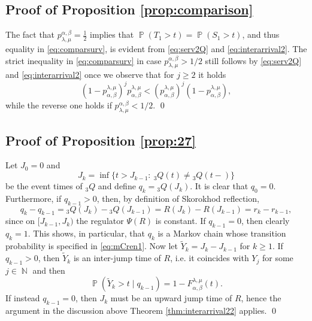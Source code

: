 \documentclass[]{amsart}
\numberwithin{equation}{section}
\theoremstyle{remark}
\theoremstyle{definition}
\DeclareMathOperator{\N}{\mathbb{N}}
\DeclareMathOperator{\bP}{\mathbb{P}}
\begin{document}
\subsection{Proof of Proposition \ref{prop:comparison}}\label{proofcomp}
	The fact that $p_{\lambda,\mu}^{\alpha,\beta}=\frac{1}{2}$ implies that $\bP({T}_1>t)=\bP({S}_1>t)$, and thus equality in \eqref{eq:comparsurv}, is evident from \eqref{eq:serv2Q} and \eqref{eq:interarrival2}. The strict inequality  in \eqref{eq:comparsurv} in case $p_{\lambda,\mu}^{\alpha,\beta}>1/2$ still follows by \eqref{eq:serv2Q} and \eqref{eq:interarrival2} once we observe that for $j \ge 2$ it holds
	\begin{equation*}
		(1-p_{\alpha,\beta}^{\lambda,\mu})^jp_{\alpha,\beta}^{\lambda,\mu}<(p_{\alpha,\beta}^{\lambda,\mu})^j(1-p_{\alpha,\beta}^{\lambda,\mu}),
	\end{equation*}
	while the reverse one holds if $p_{\lambda,\mu}^{\alpha,\beta}<1/2$.
\hfill \qed 
\subsection{Proof of Proposition \ref{prop:27}}\label{proofprop27}
	Let $J_0=0$ and
	\begin{equation*}
		J_k=\inf\{t>J_{k-1}: \ {}_3{Q}(t)\not = {}_3{Q}(t-)\}
	\end{equation*}
	be the event times of ${}_3{Q}$ and define $q_k={}_3{Q}(J_k)$. It is clear that $q_0=0$. Furthermore, if $q_{k-1}>0$, then, by definition of Skorokhod reflection,
	\begin{equation*}
		q_k-q_{k-1}={}_3{Q}(J_k)-{}_3{Q}(J_{k-1})=R(J_k)-R(J_{k-1})=r_k-r_{k-1},
	\end{equation*}
	since on $[J_{k-1},J_{k})$ the regulator $\Psi(R)$ is constant. If $q_{k-1}=0$, then clearly $q_k=1$. This shows, in particular, that $q_k$ is a Markov chain whose transition probability is specified in \eqref{eq:mCren1}. Now let $\widetilde{Y}_k=J_k-J_{k-1}$ for $k \ge 1$. If $q_{k-1}>0$, then $\widetilde{Y}_k$ is an inter-jump time of $R$, i.e. it coincides with $Y_j$ for some $j \in \N$ and then
	\begin{equation*}
		\bP(\widetilde{Y}_k>t \mid q_{k-1})=1-F_{\alpha,\beta}^{\lambda,\mu}(t).
	\end{equation*}
	If instead $q_{k-1}=0$, then $J_k$ must be an upward jump time of $R$, hence the argument in the discussion above Theorem \ref{thm:interarrival22} applies.
\hfill \qed
\end{document}

